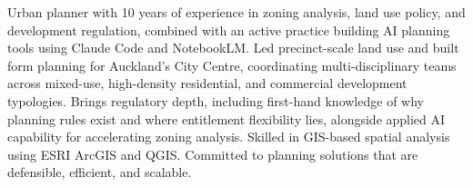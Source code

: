 \documentclass[11pt,a4paper,sans]{moderncv}
\begin{document}
\makecvtitle


\vspace{6pt}
\small{Urban planner with 10 years of experience in zoning analysis, land use policy, and development regulation, combined with an active practice building AI planning tools using Claude Code and NotebookLM. Led precinct-scale land use and built form planning for Auckland's City Centre, coordinating multi-disciplinary teams across mixed-use, high-density residential, and commercial development typologies. Brings regulatory depth, including first-hand knowledge of why planning rules exist and where entitlement flexibility lies, alongside applied AI capability for accelerating zoning analysis. Skilled in GIS-based spatial analysis using ESRI ArcGIS and QGIS. Committed to planning solutions that are defensible, efficient, and scalable.}

\end{document}
